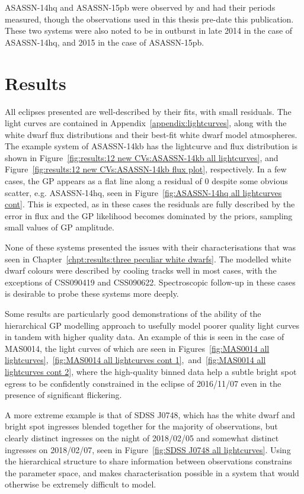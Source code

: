 ASASSN-14hq and ASASSN-15pb were observed by \citet{paterson2019} and had their periods measured, though the observations used in this thesis pre-date this publication.
These two systems were also noted to be in outburst in late 2014 in the case of ASASSN-14hq, and 2015 in the case of ASASSN-15pb.


\section{Results}
\label{sect:results:12 new CVs:results}

All eclipses presented are well-described by their fits, with small residuals. The light curves are contained in Appendix~\ref{appendix:lightcurves}, along with the white dwarf flux distributions and their best-fit white dwarf model atmospheres. The example system of ASASSN-14kb has the lightcurve and flux distribution is shown in Figure~\ref{fig:results:12 new CVs:ASASSN-14kb all lightcurves}, and Figure~\ref{fig:results:12 new CVs:ASASSN-14kb flux plot}, respectively.
In a few cases, the GP appears as a flat line along a residual of 0 despite some obvious scatter, e.g. ASASSN-14hq, seen in Figure~\ref{fig:ASASSN-14hq all lightcurves cont}. This is expected, as in these cases the residuals are fully described by the error in flux and the GP likelihood becomes dominated by the priors, sampling small values of GP amplitude.

None of these systems presented the issues with their characterisations that was seen in Chapter~\ref{chpt:results:three peculiar white dwarfs}. The modelled white dwarf colours were described by cooling tracks well in most cases, with the exceptions of CSS090419 and CSS090622. Spectroscopic follow-up in these cases is desirable to probe these systems more deeply.

Some results are particularly good demonstrations of the ability of the hierarchical GP modelling approach to usefully model poorer quality light curves in tandem with higher quality data.
An example of this is seen in the case of MAS0014, the light curves of which are seen in Figures~\ref{fig:MAS0014 all lightcurves},~\ref{fig:MAS0014 all lightcurves cont 1},~and~\ref{fig:MAS0014 all lightcurves cont 2}, where the high-quality binned data help a subtle bright spot egress to be confidently constrained in the eclipse of 2016/11/07 even in the presence of significant flickering.

A more extreme example is that of SDSS J0748, which has the white dwarf and bright spot ingresses blended together for the majority of observations, but clearly distinct ingresses on the night of 2018/02/05 and somewhat distinct ingresses on 2018/02/07, seen in Figure~\ref{fig:SDSS J0748 all lightcurves}.
Using the hierarchical structure to share information between observations constrains the parameter space, and makes characterisation possible in a system that would otherwise be extremely difficult to model.

